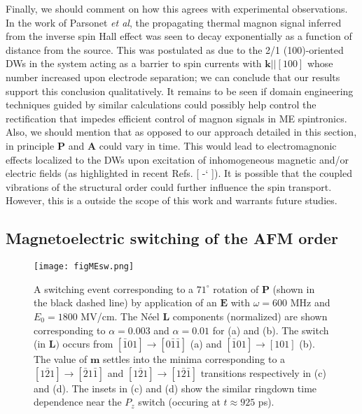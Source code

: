 \documentclass[%
 reprint,
superscriptaddress,
 amsmath,amssymb,
prb,
]{revtex4-1}
\newcommand*{\citen}[1]{%
  \begingroup
    \romannumeral-`\x %
    \setcitestyle{numbers}%
    \cite{#1}%
  \endgroup   
}
\begin{document}
%
Finally, we should comment on how this agrees with experimental observations.
%
In the work of Parsonet \emph{et al}\cite{Parsonet2022}, the propagating thermal magnon signal inferred from the inverse spin Hall effect was seen to decay exponentially as a function of distance from the source.
%
This was postulated as due to the 2/1 (100)-oriented DWs in the system acting as a barrier to spin currents with $\mathbf{k}||[100]$ whose number increased upon electrode separation; we can conclude that our results support this conclusion qualitatively.
%
It remains to be seen if domain engineering techniques guided by similar calculations could possibly help control the rectification that impedes efficient control of magnon signals in ME spintronics.
%
Also, we should mention that as opposed to our approach detailed in this section, in principle $\mathbf{P}$ and $\mathbf{A}$ could vary in time. This would lead to electromagnonic effects localized to the DWs upon excitation of inhomogeneous magnetic and/or electric fields (as highlighted in recent Refs. [\citen{Sayedaghaee2022a,Sayedaghaee2022b}]). 
%
It is possible that the coupled vibrations of the structural order could further influence the spin transport.
%
However, this is a outside the scope of this work and warrants future studies.
%


%
\subsection{Magnetoelectric switching of the AFM order}\label{sec:MEsw}
%

\begin{figure*}\centering
\texttt{[image: figMEsw.png]}%
\caption{\label{fig:MEsw} A switching event corresponding to a $71^\circ$ rotation of $\mathbf{P}$ (shown in the black dashed line) by application of an $\mathbf{E}$ with $\omega = 600$ MHz and $E_0  = 1800$ MV/cm. The N\'{e}el $\mathbf{L}$ components (normalized) are shown corresponding to $\alpha = 0.003$ and $\alpha = 0.01$ for (a) and (b). The switch (in $\mathbf{L})$ occurs from $[\bar{1}01]\to[0\bar{1}\bar{1}]$ (a) and $[\bar{1}01]\to[101]$ (b). The value of $\mathbf{m}$ settles into the minima corresponding to a $[1\bar{2}1]\to[\bar{2}1\bar{1}]$ and $[1\bar{2}1]\to[1\bar{2}\bar{1}]$ transitions respectively in (c) and (d). The insets in (c) and (d) show the similar ringdown time dependence near the $P_z$ switch (occuring at $t \approx 925$ ps).}
\end{figure*}
\end{document}
